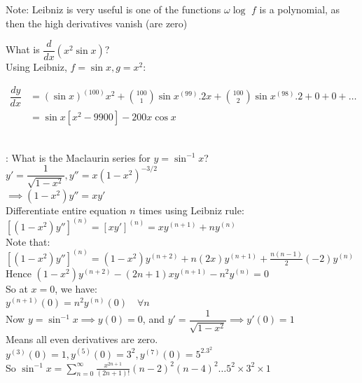 Note: Leibniz is very useful is one of the functions $\omega \log$ $f$ is a polynomial, as then the high derivatives vanish (are zero)\\

\begin{example} What is $\dfrac{d}{dx}(x^2\sin x)$?\\

Using Leibniz, $f = \sin x, g = x^2$:

\[\begin{flalign} \nonumber 
\dfrac{dy}{dx} &= (\sin x)^{(100)}x^2 + {100 \choose 1}\sin x^{(99)}.2x + {100 \choose 2}\sin x^{(98)}.2 + 0 + 0 + \dots 
\\ \nonumber
&= \sin x[x^2 -9900] - 200x\cos x
\end{flalign}\]\\
\end{example}

\begin{example}: What is the Maclaurin series for $y = \sin^{-1}x$?\\

$y' = \dfrac{1}{\sqrt{1-x^2}}, y'' = x(1-x^2)^{-3/2}$\\

$\implies (1-x^2)y'' = xy'$\\

Differentiate entire equation $n$ times using Leibniz rule:\\

$\displaystyle{
[(1-x^2)y'']^{(n)} = [xy']^{(n)} = xy^{(n+1)} + ny^{(n)}
}$\\

Note that:
$\displaystyle{
[(1-x^2)y'']^{(n)} = (1-x^2)y^{(n+2)} + n(2x)y^{(n+1)} + \frac{n(n-1)}{2}(-2)y^{(n)}
}$\\

Hence $(1-x^2)y^{(n+2)} - (2n+1)xy^{(n+1)} - n^2y^{(n)} = 0$\\

So at $x = 0$, we have:\\
$y^{(n+1)}(0) = n^2y^{(n)}(0) \quad \forall n$\\

Now $y = \sin^{-1}x \implies y(0) = 0$, and $y' = \dfrac{1}{\sqrt{1-x^2}} \implies y'(0) = 1$\\
Means all even derivatives are zero.\\

$y^{(3)}(0) = 1, y^{(5)}(0) = 3^2, y^{(7)}(0) = 5^2.3^2$\\

So $\displaystyle{
\sin^{-1}x = \sum_{n =0}^{\infty} \frac{x^{2n+1}}{(2n+1)!}(n-2)^2(n-4)^2 \dots 5^2 \times 3^2 \times 1 
}$

\end{example}
